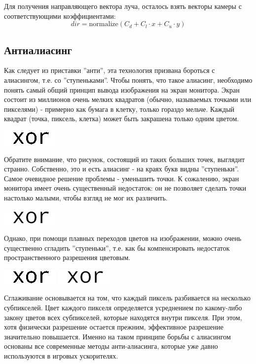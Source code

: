\documentclass[12pt, a4paper]{article}
\newcommand{\normalize}{\mathrm{normalize}}
\begin{document}
Для получения направляющего вектора луча, осталось взять векторы камеры с соответствующими коэффициентами:
$$ 
dir = \normalize(C_d + C_l \cdot x + C_u \cdot y)
$$

\subsection{Антиалиасинг}

Как следует из приставки ''анти'', эта технология призвана бороться с алиасингом, т.е. со ''ступеньками''. Чтобы понять, что такое алиасинг, необходимо понять самый общий принцип вывода изображения на экран монитора. Экран состоит из миллионов очень мелких квадратов (обычно, называемых точками или пикселями) - примерно как бумага в клетку, только гораздо мельче. Каждый квадрат (точка, пиксель, клетка) может быть закрашена только одним цветом.
\begin{center}
\includegraphics[scale=3]{imgs/aliasing.png} 
\end{center}
Обратите внимание, что рисунок, состоящий из таких больших точек, выглядит странно. Собственно, это и есть алиасинг - на краях букв видны ''ступеньки''. Самое очевидное решение проблемы - уменьшить точки. К сожалению, экран монитора имеет очень существенный недостаток: он не позволяет сделать точки настолько малыми, чтобы взгляд не мог их различить. 
\begin{center}
\includegraphics[scale=3]{imgs/antialiasing.png}
\end{center}
Однако, при помощи плавных переходов цветов на изображении, можно очень существенно сгладить ''ступеньки'', т.е. как бы компенсировать недостаток пространственного разрешения цветовым.
\begin{center}
\includegraphics[scale=1.0]{imgs/aliasing.png} 
\includegraphics[scale=1.0]{imgs/antialiasing.png}
\end{center}
Сглаживание основывается на том, что каждый пиксель разбивается на несколько субпикселей. Цвет каждого пикселя определяется усреднением по какому-либо закону цветов всех субпикселей, которые находятся внутри пикселя. При этом, хотя физически разрешение остается прежним, эффективное разрешение значительно повышается. 
Именно на таком принципе борьбы с алиасингом основаны все современные методы анти-алиасинга, которые уже давно используются в игровых ускорителях.
\end{document}
